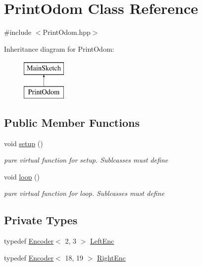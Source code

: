 \hypertarget{classPrintOdom}{\section{Print\-Odom Class Reference}
\label{classPrintOdom}
}


{\ttfamily \#include $<$Print\-Odom.\-hpp$>$}

Inheritance diagram for Print\-Odom\-:\begin{figure}[H]
\begin{center}
\leavevmode
\includegraphics[height=2.000000cm]{classPrintOdom}
\end{center}
\end{figure}
\subsection*{Public Member Functions}
\begin{DoxyCompactItemize}
\item 
void \hyperlink{classPrintOdom_ae99dc882b588ebd47873b7455da5f50a}{setup} ()
\begin{DoxyCompactList}\small\item\em pure virtual function for setup. Sublcasses must define \end{DoxyCompactList}\item 
void \hyperlink{classPrintOdom_a4b2515b27a03cb3b143256a52acd5a0c}{loop} ()
\begin{DoxyCompactList}\small\item\em pure virtual function for loop. Sublcasses must define \end{DoxyCompactList}\end{DoxyCompactItemize}
\subsection*{Private Types}
\begin{DoxyCompactItemize}
\item 
typedef \hyperlink{classEncoder}{Encoder}$<$ 2, 3 $>$ \hyperlink{classPrintOdom_a6888479f567846e63b00665fe95c4073}{Left\-Enc}
\item 
typedef \hyperlink{classEncoder}{Encoder}$<$ 18, 19 $>$ \hyperlink{classPrintOdom_ac090b58cc7388d8f2e26d5b7c912f383}{Right\-Enc}
\end{DoxyCompactItemize}
